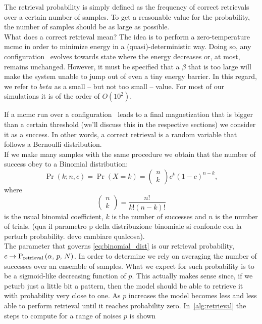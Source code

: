 \documentclass[\rootdir/main.tex]{subfiles}
\begin{document}
The retrieval probability  is simply defined as the frequency of correct retrievals over a certain number of samples. To get a reasonable value for the probability, the number of samples should be as large as possible.\\
What does a correct retrieval mean? The idea is to perform a zero-temperature \acrshort{mcmc} in order to minimize energy in a (quasi)-deterministic way. Doing so, any configuration \bsigma\ evolves towards state where the energy decreases or, at most, remains unchanged. However, it must be specified that a $\beta$ that is too large will make the system unable to jump out of even a tiny energy barrier. In this regard, we refer to $beta$ as a small -- but not too small -- value. For most of our simulations it is of the order of $O(10^2)$.

If a \acrshort{mcmc} run over a configuration \bsigma\ leads to a final magnetization that is bigger than a certain threshold (we'll discuss this in the respective sections) we consider it as a success. In other words, a correct retrieval is a random variable that follows a Bernoulli distribution.\\
If we make many samples with the same procedure we obtain that the number of success obey to a Binomial distribution:
\begin{equation*}\label{eq:binomial_dist}
    \operatorname{Pr}(k ; n, c)=\operatorname{Pr}(X=k)=\left(\begin{array}{l}
        n \\
        k
        \end{array}\right) c^k(1-c)^{n-k},
\end{equation*}
where
\begin{equation*}
    \left(\begin{array}{l}
        n \\
        k
        \end{array}\right)=\frac{n !}{k !(n-k) !}
\end{equation*}
is the usual binomial coefficient, $k$ is the number of successes and $n$ is the number of trials. (qua il parametro p della distribuzione binomiale si confonde con la perturb probability. devo cambiare qualcosa).\\
The parameter that governs \cref{eq:binomial_dist} is our retrieval probability, \ie $c \rightarrow  \mathrm{P}_{\text{retrieval}} \left( \alpha, \, p, \, N \right) $.
In order to determine  we rely on averaging the number of successes over an ensemble of samples. What we expect for such probability is to be a sigmoid-like decreasing function of $p$. This actually makes sense since, if we peturb just a little bit a pattern, then the model should be able to retrieve it with probability very close to one. As $p$ increases the model becomes less and less able to perform retrieval until it reaches probability zero. In~\cref{alg:retrieval} the steps to compute  for a range of noises $p$ is shown
\end{document}
